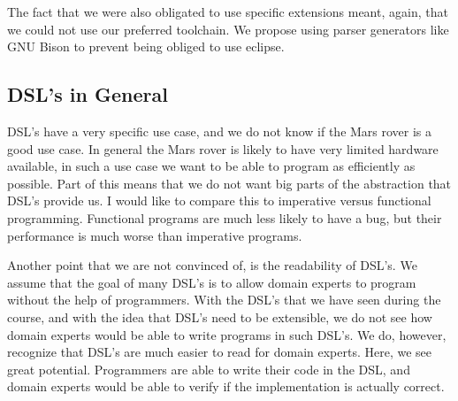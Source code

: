 \documentclass{scrartcl}
\begin{document}
The fact that we were also obligated to use specific extensions meant, again, that we could not use our preferred toolchain.
We propose using parser generators like GNU Bison to prevent being obliged to use eclipse.

\subsection{DSL's in General}
DSL's have a very specific use case, and we do not know if the Mars rover is a good use case.
In general the Mars rover is likely to have very limited hardware available, in such a use case we want to be able to program as efficiently as possible.
Part of this means that we do not want big parts of the abstraction that DSL's provide us.
I would like to compare this to imperative versus functional programming.
Functional programs are much less likely to have a bug, but their performance is much worse than imperative programs.

Another point that we are not convinced of, is the readability of DSL's.
We assume that the goal of many DSL's is to allow domain experts to program without the help of programmers.
With the DSL's that we have seen during the course, and with the idea that DSL's need to be extensible, we do not see how domain experts would be able to write programs in such DSL's.
We do, however, recognize that DSL's are much easier to read for domain experts.
Here, we see great potential.
Programmers are able to write their code in the DSL, and domain experts would be able to verify if the implementation is actually correct.
\end{document}
